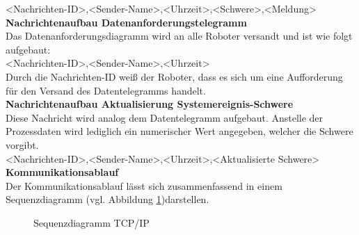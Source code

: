 \documentclass[ a4paper,
                oneside,
                toc=bibliography,
                toc=listof
                ]{scrbook}
\begin{document}
	<Nachrichten-ID>,<Sender-Name>,<Uhrzeit>,<Schwere>,<Meldung>\vspace{0.5\baselineskip}\\
	\textbf{Nachrichtenaufbau Datenanforderungstelegramm}\\
	Das Datenanforderungsdiagramm wird an alle Roboter versandt und ist wie folgt aufgebaut:\\
	<Nachrichten-ID>,<Sender-Name>,<Uhrzeit>\\
	Durch die Nachrichten-ID weiß der Roboter, dass es sich um eine Aufforderung für den Versand des Datentelegramms handelt.\vspace{0.5\baselineskip}\\
	\textbf{Nachrichtenaufbau Aktualisierung Systemereignis-Schwere}\\
	Diese Nachricht wird analog dem Datentelegramm aufgebaut. Anstelle der Prozessdaten wird lediglich ein numerischer Wert angegeben, welcher die Schwere vorgibt.\\
	<Nachrichten-ID>,<Sender-Name>,<Uhrzeit>,<Aktualisierte Schwere>\vspace{0.5\baselineskip}\\
	\textbf{Kommunikationsablauf}\\
	Der Kommunikationsablauf lässt sich zusammenfassend in einem Sequenzdiagramm (vgl. Abbildung \ref{fig:seqTCPIP})darstellen.
	\begin{figure}[h]
		\centering
		\caption{Sequenzdiagramm TCP/IP}
		\label{fig:seqTCPIP}
	\end{figure}\newline
\end{document}
